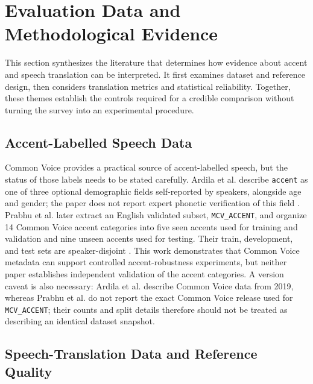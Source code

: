 \section{Evaluation Data and Methodological Evidence}
\label{sec:evaluation}

This section synthesizes the literature that determines how evidence about
accent and speech translation can be interpreted. It first examines dataset
and reference design, then considers translation metrics and statistical
reliability. Together, these themes establish the controls required for a
credible comparison without turning the survey into an experimental procedure.

\subsection{Accent-Labelled Speech Data}

Common Voice provides a practical source of accent-labelled speech, but the
status of those labels needs to be stated carefully. Ardila et al. describe
\texttt{accent} as one of three optional demographic fields self-reported by
speakers, alongside age and gender; the paper does not report expert phonetic
verification of this field \cite{ardila2020commonvoice}. Prabhu et al. later
extract an English validated subset, \texttt{MCV\_ACCENT}, and organize 14
Common Voice accent categories into five seen accents used for training and
validation and nine unseen accents used for testing. Their train, development,
and test sets are speaker-disjoint \cite{prabhu2023accentcodebooks}. This work
demonstrates that Common Voice metadata can support controlled
accent-robustness experiments, but neither paper establishes independent
validation of the accent categories. A version caveat is also necessary:
Ardila et al. describe Common Voice data from 2019, whereas Prabhu et al. do
not report the exact Common Voice release used for \texttt{MCV\_ACCENT}; their
counts and split details therefore should not be treated as describing an
identical dataset snapshot.

\subsection{Speech-Translation Data and Reference Quality}

